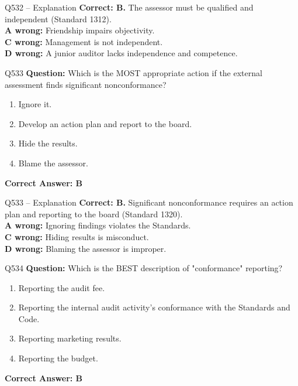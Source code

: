 \documentclass[aspectratio=169,10pt]{beamer}
\begin{document}
	\begin{frame}[t]{Q532 -- Explanation}
		\small
		\textbf{Correct: B.} The assessor must be qualified and independent (Standard 1312). \\[4pt]
		\textbf{A wrong:} Friendship impairs objectivity. \\[2pt]
		\textbf{C wrong:} Management is not independent. \\[2pt]
		\textbf{D wrong:} A junior auditor lacks independence and competence.
	\end{frame}
	
	\begin{frame}[t]{Q533}
		\small
		\textbf{Question:} Which is the MOST appropriate action if the external assessment finds significant nonconformance?
		\begin{enumerate}[label=\Alph*.,itemsep=1pt,topsep=2pt]
			\item Ignore it.
			\item Develop an action plan and report to the board.
			\item Hide the results.
			\item Blame the assessor.
		\end{enumerate}
		\vspace{4pt}
		\textbf{Correct Answer: B}
	\end{frame}
	
	\begin{frame}[t]{Q533 -- Explanation}
		\small
		\textbf{Correct: B.} Significant nonconformance requires an action plan and reporting to the board (Standard 1320). \\[4pt]
		\textbf{A wrong:} Ignoring findings violates the Standards. \\[2pt]
		\textbf{C wrong:} Hiding results is misconduct. \\[2pt]
		\textbf{D wrong:} Blaming the assessor is improper.
	\end{frame}
	
	\begin{frame}[t]{Q534}
		\small
		\textbf{Question:} Which is the BEST description of "conformance" reporting?
		\begin{enumerate}[label=\Alph*.,itemsep=1pt,topsep=2pt]
			\item Reporting the audit fee.
			\item Reporting the internal audit activity's conformance with the Standards and Code.
			\item Reporting marketing results.
			\item Reporting the budget.
		\end{enumerate}
		\vspace{4pt}
		\textbf{Correct Answer: B}
	\end{frame}
	
\end{document}
